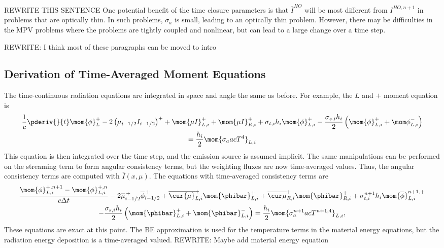 REWRITE THIS SENTENCE
One potential benefit of the time closure parameters is that $\overline I^{HO}$ will be
most different from $I^{HO,n+1}$ in problems that are optically thin.  In such problems,
$\sigma_a$ is small, leading to an optically thin problem.  However, there may be
difficulties in the MPV problems where the problems are tightly coupled and nonlinear, but
can lead to a large change over a time step.

REWRITE: I think most of these paragraphs can be moved to intro

\subsection{Derivation of Time-Averaged Moment Equations}

The time-continuous radiation equations are integrated in space and angle the same as
before.  For example, the $L$ and $+$ moment equation is
\begin{multline}
    \frac{1}{c}   \pderiv{ }{t} \mom{\phi}^+_L - 2\left({\mu}_{i-1/2} I_{i-1/2}\right)^+ + \mom{\mu I}^+_{L,i} 
    + \mom{\mu I}^+_{R,i} +  \sigma_{t,i} h_i \mom{\phi}_{L,i}^{+} -  \frac{\sigma_{s,i} h_i}{2} \left( \mom{\phi}_{L,i}^{+} +
  \mom\phi_{L,i}^{-}\right) \\ = \frac{h_i}{2} \mom{\sigma_a a c T^4}_{L,i} 
\end{multline}
This equation is then integrated over the time step, and the emission source is assumed
implicit.  The same manipulations can be
performed on the streaming term to form angular consistency terms, but the weighting fluxes are now
time-averaged values.  Thus, the angular consistency terms are computed with $\overline I(x,\mu)$.  
The equations with time-averaged consistency terms are
\begin{multline}\label{eq:t_moml_ex}
    \frac{\mom{\phi}_{L,i}^{+,n+1} - \mom{\phi}_{L,i}^{+,n}}{c \Delta t}
    -2\overline {\mu}_{i-1/2}^{\,+} \overline \phi_{i-1/2}^{\,+} + \overline{\cur {\mu}}_{L,i}^{+}
  \mom{\phibar}_{L,i}^{+}
  +  \overline{\cur\mu}_{R,i}^{+}
  \mom{\phibar}_{R,i}^{+} +  \sigma_{t,i}^{n+1} h_i 
  \mom{\overline\phi}_{L,i}^{n+1,+} \\-  \frac{\sigma_{s,i} h_i}{2} \left( \mom{\phibar}_{L,i}^{+} +
  \mom{\phibar}_{L,i}^{-}\right) = \frac{h_i}{2} \mom{\sigma_a^{n+1} a c T^{n+1,4}}_{L,i},
\end{multline}
These equations are exact at this point.  The BE approximation is used for the temperature
terms in the material energy equations, but the radiation energy deposition is a
time-averaged valued.
REWRITE: Maybe add material energy equation

